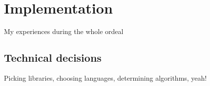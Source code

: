 \chapter{Implementation}
\label{chapter:implementation}

My experiences during the whole ordeal

\section{Technical decisions}

Picking libraries, choosing languages, determining algorithms, yeah!